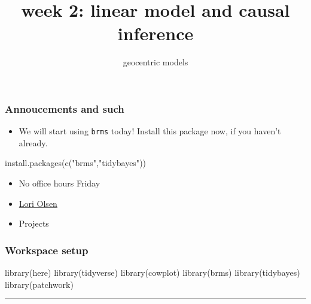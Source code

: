 \documentclass[
  letterpaper,
  DIV=11,
  numbers=noendperiod]{scrartcl}
\title{week 2: linear model and causal inference}
\subtitle{geocentric models}
\author{}
\date{}
\newenvironment{Shaded}{\begin{snugshade}}{\end{snugshade}}
\newcommand{\FunctionTok}[1]{\textcolor[rgb]{0.28,0.35,0.67}{#1}}
\newcommand{\NormalTok}[1]{\textcolor[rgb]{0.00,0.23,0.31}{#1}}
\newcommand{\StringTok}[1]{\textcolor[rgb]{0.13,0.47,0.30}{#1}}
\providecommand{\tightlist}{%
  \setlength{\itemsep}{0pt}\setlength{\parskip}{0pt}}\usepackage{longtable,booktabs,array}
\begin{document}
\maketitle


\subsubsection{Annoucements and such}\label{annoucements-and-such}

\begin{itemize}
\tightlist
\item
  We will start using \texttt{brms} today! Install this package now, if
  you haven't already.
\end{itemize}

\begin{Shaded}
\begin{Highlighting}[]
\FunctionTok{install.packages}\NormalTok{(}\FunctionTok{c}\NormalTok{(}\StringTok{"brms"}\NormalTok{,}\StringTok{"tidybayes"}\NormalTok{))}
\end{Highlighting}
\end{Shaded}

\begin{itemize}
\tightlist
\item
  No office hours Friday
\item
  \href{https://hr.uoregon.edu/outstanding-employee-awards}{Lori Olsen}
\item
  Projects
\end{itemize}

\subsubsection{Workspace setup}\label{workspace-setup}

\begin{Shaded}
\begin{Highlighting}[]
\FunctionTok{library}\NormalTok{(here)}
\FunctionTok{library}\NormalTok{(tidyverse)}
\FunctionTok{library}\NormalTok{(cowplot)}
\FunctionTok{library}\NormalTok{(brms)}
\FunctionTok{library}\NormalTok{(tidybayes)}
\FunctionTok{library}\NormalTok{(patchwork)}
\end{Highlighting}
\end{Shaded}

\begin{center}\rule{0.5\linewidth}{0.5pt}\end{center}
\end{document}
